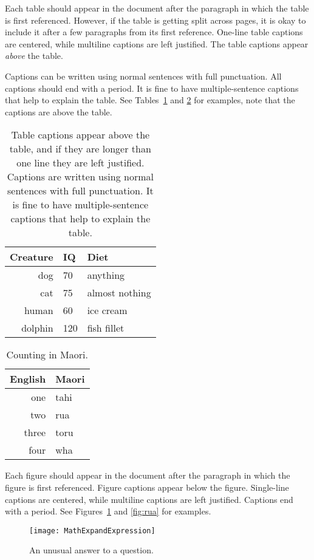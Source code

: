 \documentclass{scspaperproc}
\theoremstyle{scsthe}
\begin{document}
Each table should appear in the document after the paragraph in which the table is first referenced. However, if the table is getting split across pages, it is okay to include it after a few paragraphs from its first reference. One-line table captions are centered, while multiline captions are left justified. The table captions appear \emph{above} the table. 

Captions can be written using normal sentences with full punctuation. All captions should end with a period. It is fine to have multiple-sentence captions that help to explain the table. See Tables~\ref{tab:first} and \ref{tab:second} for examples, note that the captions are above the table.


\begin{table}[htb]
\caption{Table captions appear above the table, and if they are longer than one line they are left justified. Captions are written using normal sentences with full punctuation. It is fine to have multiple-sentence captions that help to explain the table.}\label{tab:first}
\centering
\begin{tabular}{rll}
\hline
Creature & IQ & Diet\\ \hline
dog & 70 & anything\\
cat & 75 & almost nothing\\
human & 60 & ice cream \\
dolphin & 120 & fish fillet\\
\hline
\end{tabular}
\end{table}

\begin{table}[htb]
\centering
\caption{Counting in Maori.}\label{tab:second}
\begin{tabular}{r|l}
English & Maori \\ \hline
one & tahi \\
two & rua \\
three & toru \\
four & wha \\
\end{tabular}
\end{table}

Each figure should appear in the document after the paragraph in which the figure is first referenced. Figure captions appear below the figure. Single-line captions are centered, while multiline captions are left justified. Captions end with a period. See Figures~\ref{fig:tahi} and \ref{fig:rua} for examples.

\begin{figure}[htb]
{
\centering
\texttt{[image: MathExpandExpression]}
\caption{An unusual answer to a question.}\label{fig:tahi}
}
\end{figure}
\end{document}

